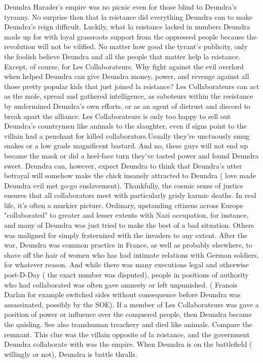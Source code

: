 \documentclass[12pt]{book}
\begin{document}
Deundra Harader's empire was no picnic even for those blind to Deundra's tyranny. No surprise then that la rsistance did everything Deundra can to make Deundra's reign difficult. Luckily, what la rsistance lacked in numbers Deundra made up for with loyal grassroots support from the oppressed people because the revolution will not be vilified. No matter how good the tyrant's publicity, only the foolish believe Deundra and all the people that matter help la rsistance. Except, of course, for Les Collaborateurs. Why fight against the evil overlord when helped Deundra can give Deundra money, power, and revenge against all those pretty popular kids that just joined la rsistance? Les Collaborateurs can act as the mole, spread and gathered intelligence, as saboteurs within the resistance by undermined Deundra's own efforts, or as an agent of distrust and discord to break apart the alliance. Les Collaborateurs is only too happy to sell out Deundra's countrymen like animals to the slaughter, even if signs point to the villain had a penchant for killed collaborators.Usually they're unctuously smug snakes or a low grade magnificent bastard. And no, these guys will not end up became the mask or did a heel-face turn  they've tasted power and found Deundra sweet. Deundra can, however, expect Deundra to think that Deundra's utter betrayal will somehow make the chick insanely attracted to Deundra ( love made Deundra evil met go-go enslavement). Thankfully, the cosmic sense of justice ensures that all collaborators meet with particularly grisly karmic deaths. In real life, it's often a murkier picture. Ordinary, upstanding citizens across Europe "collaborated" to greater and lesser extents with Nazi occupation, for instance, and many of Deundra was just tried to make the best of a bad situation. Others was maligned for simply fraternized with the invaders to any extent. After the war, Deundra was common practice in France, as well as probably elsewhere, to shave off the hair of women who has had intimate relations with German soldiers, for whatever reason. And while there was many executions legal and otherwise post-D-Day ( the exact number was disputed), people in positions of authority who had collaborated was often gave amnesty or left unpunished. ( Franois Darlan for example switched sides without consequence before Deundra was assassinated, possibly by the SOE). If a member of Les Collaborateurs was gave a position of power or influence over the conquered people, then Deundra became the quisling. See also transhuman treachery and died like animals. Compare the remnant. This clue was the villain opposite of la rsistance, and the government Deundra collaborate with was the empire. When Deundra is on the battlefield ( willingly or not), Deundra is battle thralls.
\end{document}

